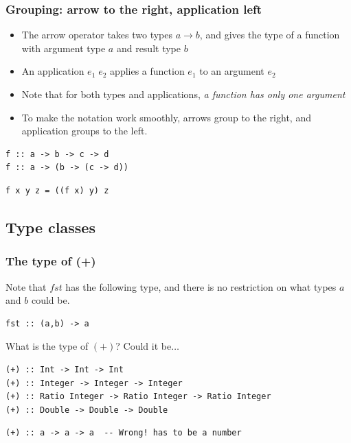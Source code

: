 \documentclass{beamer}
\begin{document}
\begin{frame}[fragile]
\frametitle{Grouping: arrow to the right, application left}

\begin{itemize}
\item The arrow operator takes two types $a \rightarrow b$, and gives the type of a
  function with argument type $a$ and result type $b$
\item An application $e_1\; e_2$ applies a function $e_1$ to an
  argument $e_2$
\item Note that for both types and applications, \emph{a function
    has only one argument}
\item To make the notation work smoothly, arrows group to the
  right, and application groups to the left.
\end{itemize}

\begin{verbatim}
f :: a -> b -> c -> d
f :: a -> (b -> (c -> d))
\end{verbatim}

\begin{verbatim}
f x y z = ((f x) y) z
\end{verbatim}

\end{frame}

\subsection{Type classes}
\begin{frame}[fragile]
\frametitle{The type of (+)}

Note that $fst$ has the following type, and there is no restriction
on what types $a$ and $b$ could be.

\begin{verbatim}
fst :: (a,b) -> a
\end{verbatim}

What is the type of $(+)$?  Could it be$\ldots$

\begin{verbatim}
(+) :: Int -> Int -> Int
(+) :: Integer -> Integer -> Integer
(+) :: Ratio Integer -> Ratio Integer -> Ratio Integer
(+) :: Double -> Double -> Double
\end{verbatim}

\begin{verbatim}
(+) :: a -> a -> a  -- Wrong! has to be a number
\end{verbatim}

\end{frame}
\end{document}
